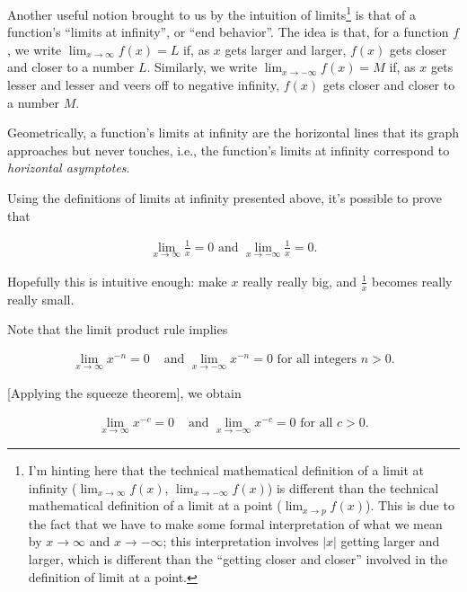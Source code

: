 Another useful notion brought to us by the intuition of limits\footnote{I'm hinting here that the technical mathematical definition of a limit at infinity ($\lim_{x \rightarrow \infty} f(x)$, $\lim_{x \rightarrow -\infty} f(x)$) is different than the technical mathematical definition of a limit at a point ($\lim_{x \rightarrow p} f(x)$). This is due to the fact that we have to make some formal interpretation of what we mean by $x \rightarrow \infty$ and $x \rightarrow -\infty$; this interpretation involves $|x|$ getting larger and larger, which is different than the ``getting closer and closer'' involved in the definition of limit at a point.} is that of a function's ``limits at infinity'', or ``end behavior''. The idea is that, for a function $f$, we write $\lim_{x \rightarrow \infty} f(x) = L$ if, as $x$ gets larger and larger, $f(x)$ gets closer and closer to a number $L$. Similarly, we write $\lim_{x \rightarrow -\infty} f(x) = M$ if, as $x$ gets lesser and lesser and veers off to negative infinity, $f(x)$ gets closer and closer to a number $M$. 

Geometrically, a function's limits at infinity are the horizontal lines that its graph approaches but never touches, i.e., the function's limits at infinity correspond to \textit{horizontal asymptotes}.

Using the definitions of limits at infinity presented above, it's possible to prove that

\begin{align*}
    \lim_{x \rightarrow \infty} \frac{1}{x} = 0 \text{ and } \lim_{x \rightarrow -\infty} \frac{1}{x} = 0. 
\end{align*}

Hopefully this is intuitive enough: make $x$ really really big, and $\frac{1}{x}$ becomes really really small.

Note that the limit product rule implies

\begin{align*}
    \lim_{x \rightarrow \infty} x^{-n} = 0 &\text{ and } \lim_{x \rightarrow -\infty} x^{-n} = 0 \text{ for all integers $n > 0$}.
\end{align*}

[Applying the squeeze theorem], we obtain

\begin{align*}
    \lim_{x \rightarrow \infty} x^{-c} = 0 &\text{ and } \lim_{x \rightarrow -\infty} x^{-c} = 0 \text{ for all $c > 0$}.
\end{align*}

